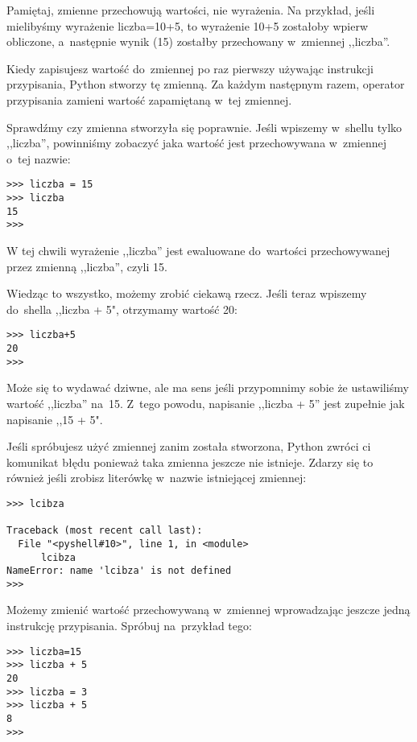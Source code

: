 \documentclass{book}
\begin{document}
Pamiętaj, zmienne przechowują wartości, nie wyrażenia. Na przykład, jeśli mielibyśmy wyrażenie liczba=10+5, to wyrażenie 10+5 zostałoby wpierw obliczone, a~następnie wynik (15) zostałby przechowany w~zmiennej ,,liczba''.

Kiedy zapisujesz wartość do~zmiennej po raz pierwszy używając instrukcji przypisania, Python stworzy tę zmienną. Za każdym następnym razem, operator przypisania zamieni wartość zapamiętaną w~tej zmiennej.

Sprawdźmy czy zmienna stworzyła się poprawnie. Jeśli wpiszemy w~shellu tylko ,,liczba'', powinniśmy zobaczyć jaka wartość jest przechowywana w~zmiennej o~tej nazwie:

\begin{lstlisting}
>>> liczba = 15
>>> liczba
15
>>> 
\end{lstlisting}

W tej chwili wyrażenie ,,liczba'' jest ewaluowane do~wartości przechowywanej przez zmienną ,,liczba'', czyli 15.

Wiedząc to wszystko, możemy zrobić ciekawą rzecz. Jeśli teraz wpiszemy do~shella ,,liczba + 5", otrzymamy wartość 20:

\begin{lstlisting}
>>> liczba+5
20
>>> 
\end{lstlisting}

Może się to wydawać dziwne, ale ma sens jeśli przypomnimy sobie że ustawiliśmy wartość ,,liczba'' na~15. Z~tego powodu, napisanie ,,liczba + 5'' jest zupełnie jak napisanie ,,15 + 5".

Jeśli spróbujesz użyć zmiennej zanim została stworzona, Python zwróci ci komunikat błędu ponieważ taka zmienna jeszcze nie istnieje. Zdarzy się to również jeśli zrobisz literówkę w~nazwie istniejącej zmiennej:


\begin{lstlisting}
>>> lcibza

Traceback (most recent call last):
  File "<pyshell#10>", line 1, in <module>
      lcibza
NameError: name 'lcibza' is not defined
>>> 
\end{lstlisting}

Możemy zmienić wartość przechowywaną w~zmiennej wprowadzając jeszcze jedną instrukcję przypisania. Spróbuj na~przykład tego:

\begin{lstlisting}
>>> liczba=15
>>> liczba + 5
20
>>> liczba = 3
>>> liczba + 5
8
>>> 
\end{lstlisting}
\end{document}
